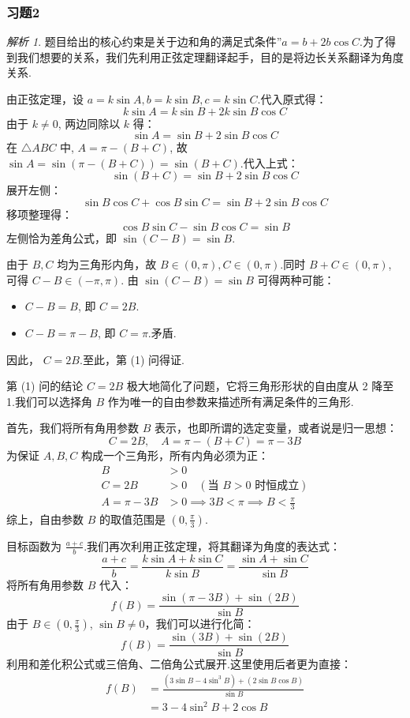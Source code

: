 \documentclass[12pt,a4paper]{ctexbook}
\theoremstyle{definition}
\theoremstyle{remark}
\newtheorem*{solution}{解析}
\begin{document}
	\subsubsection{习题2}
	\begin{solution}
		题目给出的核心约束是关于边和角的满足式条件”$a=b+2b\cos C$.为了得到我们想要的关系，我们先利用正弦定理翻译起手，目的是将边长关系翻译为角度关系.
		
		由正弦定理，设 $a=k\sin A, b=k\sin B, c=k\sin C$.代入原式得：
		\[
		k\sin A = k\sin B + 2k\sin B \cos C
		\]
		由于 $k \neq 0$, 两边同除以 $k$ 得：
		\[
		\sin A = \sin B + 2\sin B \cos C
		\]
		在 $\triangle ABC$ 中, $A = \pi-(B+C)$, 故 $\sin A = \sin(\pi-(B+C)) = \sin(B+C)$.代入上式：
		\[
		\sin(B+C) = \sin B + 2\sin B \cos C
		\]
		展开左侧：
		\[
		\sin B \cos C + \cos B \sin C = \sin B + 2\sin B \cos C
		\]
		移项整理得：
		\[
		\cos B \sin C - \sin B \cos C = \sin B
		\]
		左侧恰为差角公式，即 $\sin(C-B) = \sin B$.
		
		由于 $B,C$ 均为三角形内角，故 $B \in (0,\pi), C \in (0,\pi)$.同时 $B+C \in (0,\pi)$, 可得 $C-B \in (-\pi, \pi)$.
		由 $\sin(C-B)=\sin B$ 可得两种可能：
		\begin{itemize}
			\item $C-B = B$, 即 $C=2B$.
			\item $C-B = \pi - B$, 即 $C=\pi$.矛盾.
		\end{itemize}
		因此， $C=2B$.至此，第 (1) 问得证.
		
		第 (1) 问的结论 $C=2B$ 极大地简化了问题，它将三角形形状的自由度从 2 降至 1.我们可以选择角 $B$ 作为唯一的自由参数来描述所有满足条件的三角形.
		
		首先，我们将所有角用参数 $B$ 表示，也即所谓的选定变量，或者说是归一思想：
		\[
		C=2B, \quad A = \pi - (B+C) = \pi - 3B
		\]
		为保证 $A,B,C$ 构成一个三角形，所有内角必须为正：
		\begin{align*}
			B &> 0 \\
			C = 2B &> 0 \quad (\text{当 } B>0 \text{ 时恒成立}) \\
			A = \pi - 3B &> 0 \implies 3B < \pi \implies B < \frac{\pi}{3}
		\end{align*}
		综上，自由参数 $B$ 的取值范围是 $(0, \frac{\pi}{3})$.
		
	目标函数为 $\frac{a+c}{b}$.我们再次利用正弦定理，将其翻译为角度的表达式：
		\[
		\frac{a+c}{b} = \frac{k\sin A + k\sin C}{k\sin B} = \frac{\sin A + \sin C}{\sin B}
		\]
		将所有角用参数 $B$ 代入：
		\[
		f(B) = \frac{\sin(\pi-3B)+\sin(2B)}{\sin B}
		\]
		由于 $B \in (0, \frac{\pi}{3})$, $\sin B \neq 0$，我们可以进行化简：
		\[
		f(B) = \frac{\sin(3B)+\sin(2B)}{\sin B}
		\]
		利用和差化积公式或三倍角、二倍角公式展开.这里使用后者更为直接：
		\begin{align*}
			f(B) &= \frac{(3\sin B - 4\sin^3 B) + (2\sin B \cos B)}{\sin B} \\
			&= 3 - 4\sin^2 B + 2\cos B
		\end{align*}
		

\end{solution}
\end{document}
